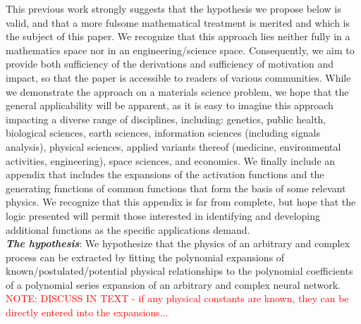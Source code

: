 This previous work strongly suggests that the hypothesis we propose below is valid, and that a more fulsome mathematical treatment is merited and which is the subject of this paper.  We recognize that this approach lies neither fully in a mathematics space nor in an engineering/science space. Consequently, we aim to provide both sufficiency of the derivations and sufficiency of motivation and impact, so that the paper is accessible to readers of various communities.  While we demonstrate the approach on a materials science problem, we hope that the general applicability will be apparent, as it is easy to imagine this approach impacting a diverse range of disciplines, including: genetics, public health, biological sciences, earth sciences, information sciences (including signals analysis), physical sciences, applied variants thereof (medicine, environmental activities, engineering), space sciences, and economics.  We finally include an appendix that includes the expansions of the activation functions and the generating functions of common functions that form the basis of some relevant physics.  We recognize that this appendix is far from complete, but hope that the logic presented will permit those interested in identifying and developing additional functions as the specific applications demand.\\

\textbf{\textit{The hypothesis}}: We hypothesize that the physics of an arbitrary and complex process can be extracted by fitting the polynomial expansions of known/postulated/potential physical relationships to the polynomial coefficients of a polynomial series expansion of an arbitrary and complex neural network.\\

\textcolor{red}{NOTE:  DISCUSS IN TEXT - if any physical constants are known, they can be directly entered into the expansions...}



